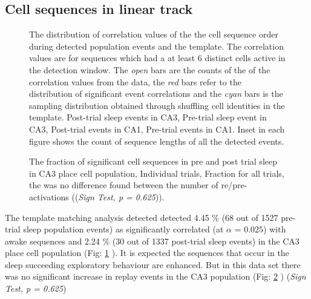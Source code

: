 \begin{figure}[hb!]
\centering

\end{figure}



\subsection{Cell sequences in linear track}

\begin{figure}[H]
\centering
{}
\caption[Template matching analysis]{The distribution of correlation values of the the cell sequence order during detected population events and the template. The correlation values are for sequences which had a at least 6 distinct cells active in the detection window. The \emph{open} bars are the counts of the of the correlation values from the data, the \emph{red} bars refer to the distribution of significant event correlations and the \emph{cyan} bars is the sampling distribution obtained through shuffling cell identities in the template.  Post-trial sleep events in CA3,   Pre-trial sleep event in CA3,  Post-trial events in CA1,   Pre-trial events in CA1. Inset in each figure shows the count of sequence lengths of all the detected events.}
\label{tmcorr}
\end{figure}

\begin{figure}[H!]
\centering
{}
\caption[Pre and post trial sleep events CA3]{The fraction of significant cell sequences in pre and post trial sleep in CA3 place cell population,  Individual trials,  Fraction for all trials, the was no difference found between the number of re/pre-activations ((\emph{Sign Test, p = 0.625})).}
\label{fig:pre2postca3}
\end{figure}
The template matching analysis detected detected 4.45 \% (68 out of 1527 pre-trial sleep population events) as significantly correlated (at $ \alpha $ = $0.025$) with awake sequences and 2.24 \% (30 out of 1337 post-trial sleep events) in the CA3 place cell population (Fig: \ref{tmcorr} ). It is expected the sequences that occur in the sleep succeeding exploratory behaviour are enhanced. But in this data set there was no significant increase in replay events in the CA3 population (Fig: \ref{fig:pre2postca3} ) (\emph{Sign Test, p = 0.625})

